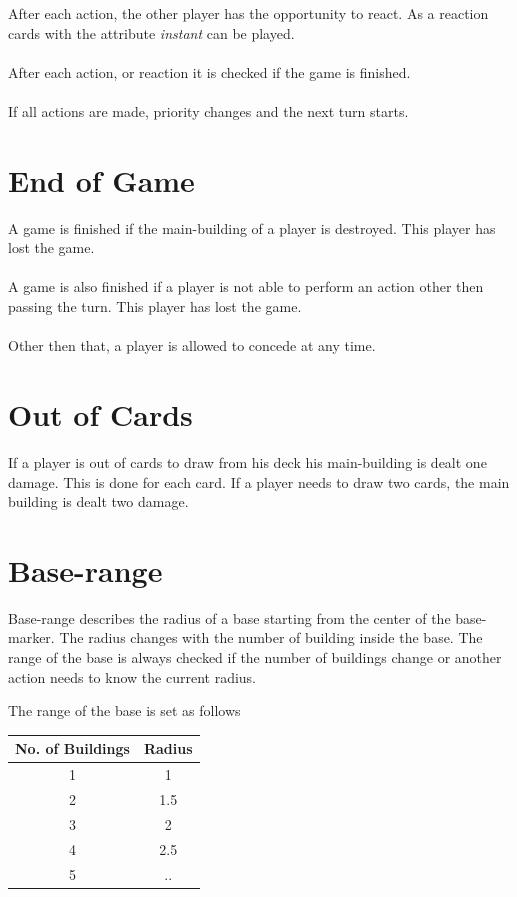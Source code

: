 \documentclass[a5paper,pagesize,10pt,bibtotoc,pointlessnumbers,
normalheadings,DIV=9,twoside=false]{scrbook}
\begin{document}
After each action, the other player has the opportunity to react. As a reaction cards with the attribute \emph{instant} can be played.\\
\\
After each action, or reaction it is checked if the game is finished.\\
\\
If all actions are made, priority changes and the next turn starts.

\section{End of Game}
A game is finished if the main-building of a player is destroyed. This player has lost the game.\\
\\
A game is also finished if a player is not able to perform an action other then passing the turn. This player has lost the game.\\
\\
Other then that, a player is allowed to concede at any time.


\section{Out of Cards}
If a player is out of cards to draw from his deck his main-building is dealt one damage. This is done for each card.
If a player needs to draw two cards, the main building is dealt two damage.\\


\section{Base-range}
Base-range describes the radius of a base starting from the center of the base-marker. The radius changes with the number of building inside the base.
The range of the base is always checked if the number of buildings change or another action needs to know the current radius.

The range of the base is set as follows

\begin{center}
 \begin{tabular}{||c c||} 
 \hline
 No. of Buildings & Radius\\
 \hline\hline
 1 & 1 \\ 
 \hline
 2 & 1.5 \\
 \hline
 3 & 2 \\
 \hline
 4 & 2.5\\
 \hline
 5 & .. \\
 \hline
\end{tabular}
\end{center}
\end{document}
